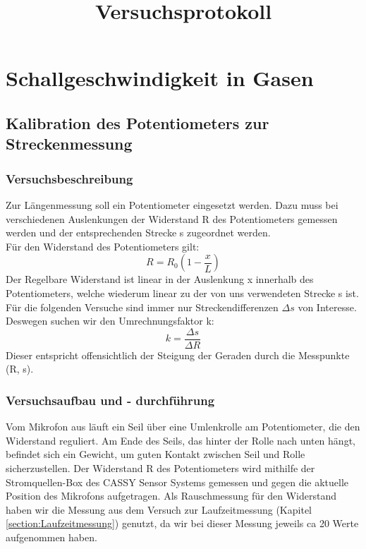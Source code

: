 \documentclass[a4paper]{article}
\begin{document}
	\title{Versuchsprotokoll}
	\tableofcontents
	\newpage
	\section{Schallgeschwindigkeit in Gasen}
	\subsection{Kalibration des Potentiometers zur Streckenmessung}
	\label{section:Kalibration_Poti}
	\subsubsection{Versuchsbeschreibung}
	Zur Längenmessung soll ein Potentiometer eingesetzt werden. Dazu muss bei verschiedenen Auslenkungen der Widerstand R des Potentiometers gemessen werden und der entsprechenden Strecke s zugeordnet werden.\\
	
	Für den Widerstand des Potentiometers gilt:
	\begin{equation}
	R = R_0(1-\frac{x}{L})
	\end{equation}
	Der Regelbare Widerstand ist linear in der Auslenkung x innerhalb des Potentiometers, welche wiederum linear zu der von uns verwendeten Strecke s ist.\\
	
	Für die folgenden Versuche sind immer nur Streckendifferenzen $\Delta s$ von Interesse. Deswegen suchen wir den Umrechnungsfaktor k:
	\begin{equation}
	k = \frac{\Delta s}{\Delta R}
	\end{equation}
	Dieser entspricht offensichtlich der Steigung der Geraden durch die Messpunkte (R, s).
	
	\subsubsection{Versuchsaufbau und - durchführung}

	Vom Mikrofon aus läuft ein Seil über eine Umlenkrolle am Potentiometer, die den Widerstand reguliert. Am Ende des Seils, das hinter der Rolle nach unten hängt, befindet sich ein Gewicht, um guten Kontakt zwischen Seil und Rolle sicherzustellen. Der Widerstand R des Potentiometers wird mithilfe der Stromquellen-Box des CASSY Sensor Systems gemessen und gegen die aktuelle Position des Mikrofons aufgetragen. Als Rauschmessung für den Widerstand haben wir die Messung aus dem Versuch zur Laufzeitmessung (Kapitel \ref{section:Laufzeitmessung}) genutzt, da wir bei dieser Messung jeweils ca 20 Werte aufgenommen haben.\\
	
\end{document}
